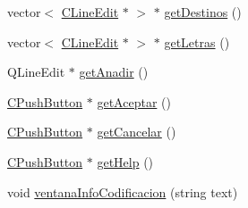 \begin{DoxyCompactItemize}
\item 
vector$<$ \hyperlink{classCLineEdit}{C\+Line\+Edit} $\ast$ $>$ $\ast$ \hyperlink{classCAsistenteCodificacion_a8e55263b52df54df6353f6a2ae4a88df}{get\+Destinos} ()
\item 
vector$<$ \hyperlink{classCLineEdit}{C\+Line\+Edit} $\ast$ $>$ $\ast$ \hyperlink{classCAsistenteCodificacion_ae4e5d1b2a9830a026897bed772bfb49e}{get\+Letras} ()
\item 
Q\+Line\+Edit $\ast$ \hyperlink{classCAsistenteCodificacion_a7714a288c08739425ed8cd4d927451e6}{get\+Anadir} ()
\item 
\hyperlink{classCPushButton}{C\+Push\+Button} $\ast$ \hyperlink{classCAsistenteCodificacion_ac8253a5adbe02d45daf20afe4d7678f2}{get\+Aceptar} ()
\item 
\hyperlink{classCPushButton}{C\+Push\+Button} $\ast$ \hyperlink{classCAsistenteCodificacion_a4e1025d9e7c189d22a19d97474499ceb}{get\+Cancelar} ()
\item 
\hyperlink{classCPushButton}{C\+Push\+Button} $\ast$ \hyperlink{classCAsistenteCodificacion_adf9ae1bf08b445fb095246b95b723450}{get\+Help} ()
\item 
void \hyperlink{classCAsistenteCodificacion_a8d5a01cef945d9a6b72dd54a9aaecec2}{ventana\+Info\+Codificacion} (string text)
\end{DoxyCompactItemize}
